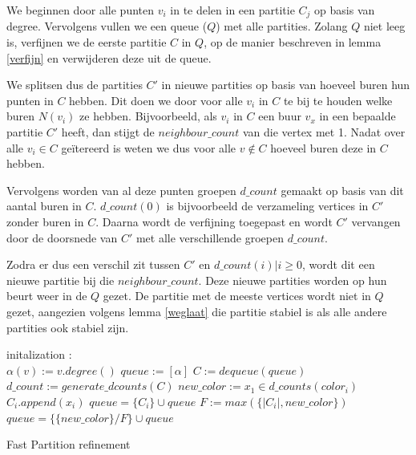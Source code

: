 \documentclass[twoside]{article}
\begin{document}
\begin{multicols}{2}
We beginnen door alle punten $v_i$ in te delen in een partitie $C_j$ op basis van degree. Vervolgens vullen we een queue ($Q$) met alle partities.
Zolang $Q$ niet leeg is, verfijnen we de eerste partitie $C$ in $Q$, op de manier beschreven in lemma \ref{verfijn} en verwijderen deze uit de queue.

We splitsen dus de partities $ C' $  in nieuwe partities op basis van hoeveel buren hun punten in $C$ hebben. Dit doen we door voor alle $v_{i}$ in $C$ te bij te houden welke buren $N(v_{i})$ ze hebben. Bijvoorbeeld, als $v_{i}$ in $C$ een buur $v_{x}$ in een bepaalde partitie $C'$ heeft, dan stijgt de $neighbour\_count$ van die vertex met 1. Nadat over alle $v_{i} \in C$ geïtereerd is weten we dus voor alle $v \not \in  C$ hoeveel buren deze in $C$ hebben.

Vervolgens worden van al deze punten groepen $d\_count$ gemaakt op basis van dit aantal buren in $C$. $d\_count(0)$ is bijvoorbeeld de verzameling vertices in $C'$ zonder buren in $C$. Daarna wordt de verfijning toegepast en wordt $C'$ vervangen door de doorsnede van $C'$ met alle verschillende groepen $d\_count$.

Zodra er dus een verschil zit tussen $C'$ en $d\_count(i) | i\geq 0$, wordt dit een nieuwe partitie bij die $neighbour\_count$. Deze nieuwe partities worden op hun beurt weer in de $Q$ gezet. De partitie met de meeste vertices wordt niet in $Q$ gezet, aangezien volgens lemma \ref{weglaat} die partitie stabiel is als alle andere partities ook stabiel zijn.

\begin{algorithm}[H]
initalization \;
: \\
{$\alpha(v) := v.degree()$}
$queue := [\alpha]$\;
{$C := dequeue(queue)$\;
$d\_count := generate\_dcounts(C)$\;
{
{$new\_color := x_{1} \in d\_counts(color_{i})$ \;
{$C_{i}.append(x_{i}) $ }
{$ queue = \{C_{i}\} \cup queue $ \;}
{	$ F := max(\{|C_{i}|, new\_color \} ) $ \;
$queue = \{ \{new\_color \} / F \} \cup queue $}}}}
\caption{Fast Partition refinement}
\EndFunction
\end{algorithm}
\pagebreak


\end{multicols}
\end{document}
